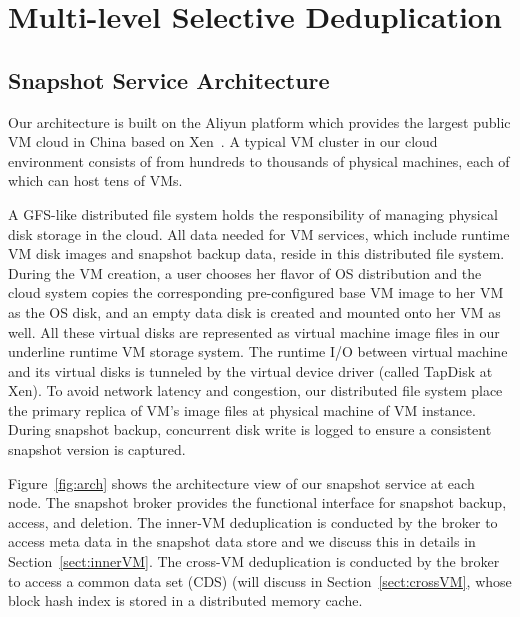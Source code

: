 \section{Multi-level Selective Deduplication}
\label{sect:arch}

\subsection{Snapshot Service Architecture}
Our architecture is built on the Aliyun platform which provides the largest public VM cloud in China 
based on Xen~\cite{Xen2003}. A typical VM cluster in our cloud environment
consists of from hundreds to thousands of physical machines, each of which can
host tens of VMs.

A GFS-like distributed file system holds the responsibility of managing physical disk storage
in the cloud. All data needed for VM services, which include runtime VM disk images and snapshot backup data,
reside in this distributed file system.
During the VM creation, a user chooses her flavor of OS distribution and the cloud system 
copies the corresponding pre-configured base VM image to her VM as the OS disk, 
and an empty data disk is created and mounted onto her VM as well. 
All these virtual disks are represented as virtual machine image files in our
underline runtime VM storage system. The runtime I/O between virtual machine and its virtual
disks is tunneled by the virtual device driver (called TapDisk\cite{Warfield2005} at Xen). To avoid network latency and congestion, 
our distributed file system place the primary replica of VM's 
image files at physical machine of VM instance.
During snapshot backup, concurrent disk write is logged 
to ensure a consistent snapshot version is captured. 

Figure~\ref{fig:arch} shows the architecture view of our snapshot service
at each node. The snapshot broker provides the functional interface for  snapshot backup, access, and deletion.
The inner-VM  deduplication is conducted by the broker to access meta data in the snapshot data store
and we discuss this in details in Section~\ref{sect:innerVM}.
The cross-VM deduplication is conducted by the broker to access 
a common data set (CDS) (will discuss in Section~\ref{sect:crossVM},
whose block hash index is stored in a distributed memory cache. 

